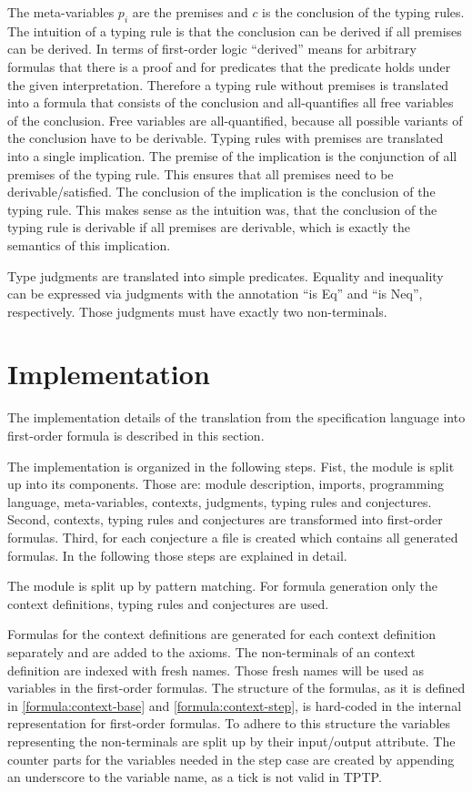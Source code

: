 The meta-variables $p_i$ are the premises and $c$ is the conclusion of
the typing rules. The intuition of a typing rule is that the
conclusion can be derived if all premises can be derived. In terms of
first-order logic ``derived'' means for arbitrary formulas that there
is a proof and for predicates that the predicate holds under the given
interpretation. Therefore a typing rule without premises is translated
into a formula that consists of the conclusion and all-quantifies all
free variables of the conclusion. Free variables are all-quantified,
because all possible variants of the conclusion have to be derivable.
Typing rules with premises are translated into a single
implication. The premise of the implication is the conjunction of all
premises of the typing rule. This ensures that all premises need to be
derivable/satisfied. The conclusion of the implication is the
conclusion of the typing rule. This makes sense as the intuition was,
that the conclusion of the typing rule is derivable if all premises
are derivable, which is exactly the semantics of this implication.

Type judgments are translated into simple predicates. Equality and
inequality can be expressed via judgments with the annotation ``is
Eq'' and ``is Neq'', respectively. Those judgments must have exactly
two non-terminals.
\section{Implementation}
\label{sec:implementation-fof}
The implementation details of the translation from the specification
language into first-order formula is described in this section.

The implementation is organized in the following steps. Fist, the
module is split up into its components. Those are: module description,
imports, programming language, meta-variables, contexts,
judgments, typing rules and conjectures. Second, contexts, typing
rules and conjectures are transformed into first-order
formulas. Third, for each conjecture a file is created which contains
all generated formulas. In the following those steps are explained in
detail.

The module is split up by pattern matching. For formula generation
only the context definitions, typing rules and conjectures are
used.

Formulas for the context definitions are generated for each
context definition separately and are added to the axioms. The
non-terminals of an context definition are indexed with fresh
names. Those fresh names will be used as variables in the first-order
formulas. The structure of the formulas, as it is defined in
\ref{formula:context-base} and \ref{formula:context-step}, is
hard-coded in the internal representation for first-order formulas. To
adhere to this structure the variables representing the non-terminals
are split up by their input/output attribute. The counter parts for
the variables needed in the step case are created by appending an
underscore to the variable name, as a tick is not valid in TPTP.

